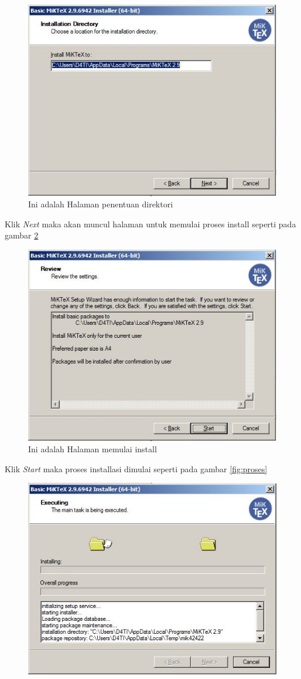 \begin{enumerate}
{\begin{figure}[!htbp]
 		 \includegraphics[width=.75\textwidth]{figures/Miktex/dir.JPG}
  		 \caption{Ini adalah Halaman penentuan direktori}\label{fig:dir}
		 \end{figure}
	\item Klik \textit{Next} maka akan muncul halaman untuk memulai proses install seperti pada gambar \ref{fig:start}
		 \begin{figure}[!htbp]
  		 \centering
 		 \includegraphics[width=.75\textwidth]{figures/Miktex/start.JPG}
  		 \caption{Ini adalah Halaman memulai install}\label{fig:start}
		 \end{figure}
	\item Klik \textit{Start} maka proses installasi dimulai seperti pada gambar \ref{fig:proses}
		 \begin{figure}[!htbp]
  		 \centering
 		 \includegraphics[width=.75\textwidth]{figures/Miktex/proses.JPG}

\end{figure}}
\end{enumerate}
